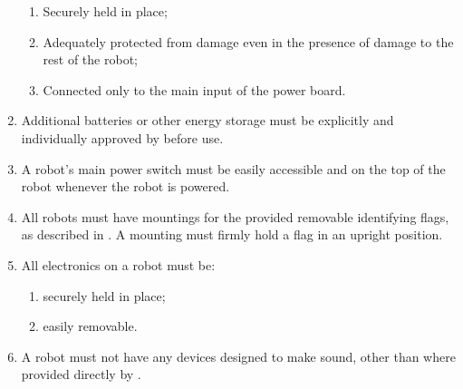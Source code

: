 \begin{enumerate}
  \begin{enumerate}
    \item Securely held in place;
    \item Adequately protected from damage even in the presence of damage to the
          rest of the robot;
    \item Connected only to the main input of the power board.
  \end{enumerate}
\item Additional batteries or other energy storage must be explicitly and
     individually approved by \org before use.
\item A robot's main power switch must be easily accessible and on the top of
      the robot whenever the robot is powered.
\item All robots must have mountings for the provided removable identifying flags,
      as described in . A mounting must firmly hold a flag
      in an upright position.
\item All electronics on a robot must be:
  \begin{enumerate}
    \item securely held in place;
    \item easily removable.
  \end{enumerate}
\item A robot must not have any devices designed to make sound, other than
      where provided directly by \org{}.
\end{enumerate}

